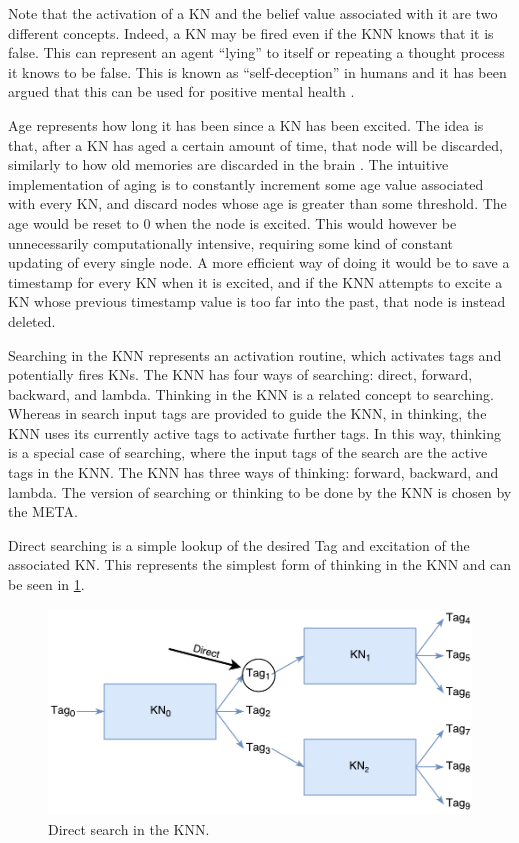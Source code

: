 \documentclass[titlepage,11pt]{article}
\begin{document}
Note that the activation of a KN and the belief value associated with it are two different concepts. Indeed, a KN may be fired even if the KNN knows that it is false. This can represent an agent ``lying'' to itself or repeating a thought process it knows to be false. This is known as ``self-deception'' in humans and it has been argued that this can be used for positive mental health \cite{taylor1989positive}.

Age represents how long it has been since a KN has been excited. The idea is that, after a KN has aged a certain amount of time, that node will be discarded, similarly to how old memories are discarded in the brain \cite{aging}. The intuitive implementation of aging is to constantly increment some age value associated with every KN, and discard nodes whose age is greater than some threshold. The age would be reset to 0 when the node is excited. This would however be unnecessarily computationally intensive, requiring some kind of constant updating of every single node. A more efficient way of doing it would be to save a timestamp for every KN when it is excited, and if the KNN attempts to excite a KN whose previous timestamp value is too far into the past, that node is instead deleted.

Searching in the KNN represents an activation routine, which activates tags and potentially fires KNs. The KNN has four ways of searching: direct, forward, backward, and lambda. Thinking in the KNN is a related concept to searching. Whereas in search input tags are provided to guide the KNN, in thinking, the KNN uses its currently active tags to activate further tags. In this way, thinking is a special case of searching, where the input tags of the search are the active tags in the KNN. The KNN has three ways of thinking: forward, backward, and lambda. The version of searching or thinking to be done by the KNN is chosen by the META. 

Direct searching is a simple lookup of the desired Tag and excitation of the associated KN. This represents the simplest form of thinking in the KNN and can be seen in \cref{fig:direct_search}.

\begin{figure}[!htb]
	\includegraphics[width=\columnwidth]{figures/direct_search.pdf}
	\caption{Direct search in the KNN.}
	\label{fig:direct_search}
\end{figure}
\end{document}
